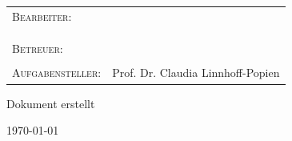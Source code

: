 \documentclass{article}
\begin{document}


\let\oldcontentsname\contentsname
\renewcommand{\contentsname}{\centering\small\oldcontentsname}

\title{\thesistitle}
\author{\authorA {} \authorB}
\date{\today}

\begin{titlepage}
	\centering
    \BgThispage
    \vspace*{-\topmargin}\vspace{-1in}%
    \vspace*{-\headheight}\vspace{-\headsep}%
    \vspace*{-\topskip}%
    \hspace*{-\oddsidemargin}
    \hspace*{-\marginparsep}
    \hspace*{-\marginparwidth}
	\vspace*{1.75cm}
	\par
	{\scshape\large \seminar\par}
	{\huge\bfseries\thesistitle\par}
	\vspace*{1.75cm}
	\large \begin{tabular}{ l l }
	  \textsc{Bearbeiter}:&{\authorA}\\
	  &{\authorB}\\&{\authorC}\\
	  \\
	  \textsc{Betreuer:}&{\supervisor}\\
	  \\
	  \textsc{Aufgabensteller:}&{Prof. Dr. Claudia Linnhoff-Popien}\\
	\end{tabular}
	\par
	\vspace*{1.75cm}
	\begin{otherlanguage}{ngerman}
		{\large Dokument erstellt\par\today\par}
	\end{otherlanguage}
	\newpage
	\thispagestyle{empty}
	\mbox{}
	\newpage
\end{titlepage}
\cleardoublepage
\end{document}
